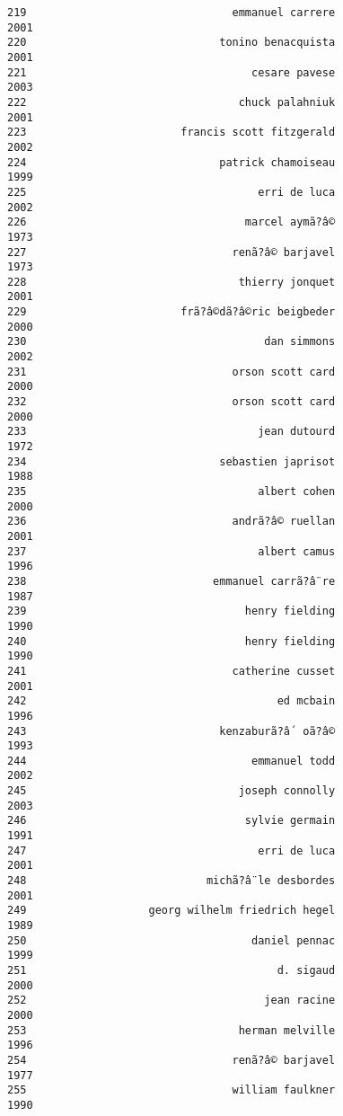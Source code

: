 \documentclass[
]{report}
\begin{document}
\begin{verbatim}
219                                emmanuel carrere                2001
220                              tonino benacquista                2001
221                                   cesare pavese                2003
222                                 chuck palahniuk                2001
223                        francis scott fitzgerald                2002
224                              patrick chamoiseau                1999
225                                    erri de luca                2002
226                                  marcel aymã?â©                1973
227                                renã?â© barjavel                1973
228                                 thierry jonquet                2001
229                        frã?â©dã?â©ric beigbeder                2000
230                                     dan simmons                2002
231                                orson scott card                2000
232                                orson scott card                2000
233                                    jean dutourd                1972
234                              sebastien japrisot                1988
235                                    albert cohen                2000
236                                andrã?â© ruellan                2001
237                                    albert camus                1996
238                             emmanuel carrã?â¨re                1987
239                                  henry fielding                1990
240                                  henry fielding                1990
241                                catherine cusset                2001
242                                       ed mcbain                1996
243                              kenzaburã?â´ oã?â©                1993
244                                   emmanuel todd                2002
245                                 joseph connolly                2003
246                                  sylvie germain                1991
247                                    erri de luca                2001
248                            michã?â¨le desbordes                2001
249                   georg wilhelm friedrich hegel                1989
250                                   daniel pennac                1999
251                                       d. sigaud                2000
252                                     jean racine                2000
253                                 herman melville                1996
254                                renã?â© barjavel                1977
255                                william faulkner                1990

\end{verbatim}
\end{document}
